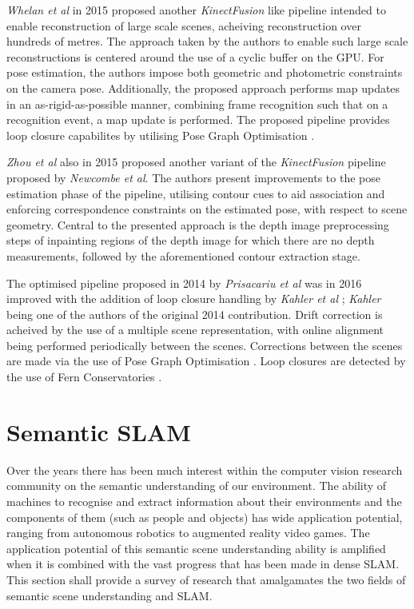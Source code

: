 {\textit{Whelan et al} \cite{Whelan2015} in 2015 proposed another \textit{KinectFusion} 
\cite{Newcombe2011} like pipeline intended to enable reconstruction of large scale scenes, 
acheiving reconstruction over hundreds of metres. The approach taken by the authors to enable 
such large scale reconstructions is centered around the use of a cyclic buffer on the GPU. For pose 
estimation, the authors impose both geometric and photometric constraints on the camera pose. 
Additionally, the proposed approach performs map updates in an as-rigid-as-possible \cite{Igarashi2005} 
manner, combining frame recognition such that on a recognition event, a map update is performed.
The proposed pipeline provides loop closure capabilites by utilising Pose Graph Optimisation 
\cite{Grisetti2010}.

\textit{Zhou et al} \cite{Zhou2015} also in 2015 proposed another variant of the 
\textit{KinectFusion} \cite{Newcombe2011} pipeline proposed by \textit{Newcombe et al}. 
The authors present improvements to the pose estimation phase of the pipeline, utilising 
contour cues to aid association and enforcing correspondence constraints on the estimated 
pose, with respect to scene geometry. Central to the presented approach is the depth image 
preprocessing steps of inpainting \cite{Bertalmio2000} regions of the depth image for which 
there are no depth measurements, followed by the aforementioned contour extraction stage.

The optimised pipeline proposed in 2014 by \textit{Prisacariu et al} \cite{Prisacariu2014} was 
in 2016 improved with the addition of loop closure handling by \textit{Kahler et al} \cite{Kahler2016}; 
\textit{Kahler} being one of the authors of the original 2014 contribution. Drift correction is acheived 
by the use of a multiple scene representation, with online alignment being performed periodically 
between the scenes. Corrections between the scenes are made via the use of Pose Graph Optimisation 
\cite{Grisetti2010}. Loop closures are detected by the use of Fern Conservatories \cite{Glocker2014}.

\section{Semantic SLAM}
Over the years there has been much interest within the computer vision research community on 
the semantic understanding of our environment. The ability of machines to recognise and extract 
information about their environments and the components of them (such as people and objects) has 
wide application potential, ranging from autonomous robotics to augmented reality video games. 
The application potential of this semantic scene understanding ability is amplified when it is 
combined with the vast progress that has been made in dense SLAM. This section shall provide a 
survey of research that amalgamates the two fields of semantic scene understanding and SLAM.

}
